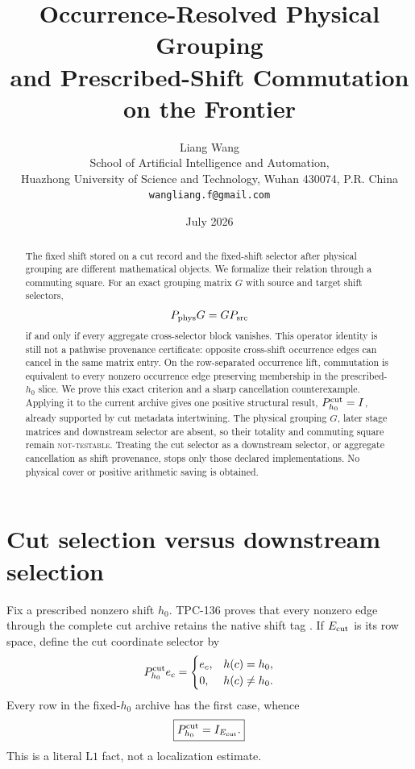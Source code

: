 \documentclass[11pt]{article}
\title{\textbf{Occurrence-Resolved Physical Grouping}\\
\textbf{and Prescribed-Shift Commutation}\\
\textbf{on the Frontier}}
\author{Liang Wang\\
School of Artificial Intelligence and Automation,\\
Huazhong University of Science and Technology, Wuhan 430074, P.R. China\\
\texttt{wangliang.f@gmail.com}}
\date{July 2026}
\theoremstyle{definition}
\theoremstyle{remark}
\newcommand{\Lone}{\mathrm{L1}}
\begin{document}
\maketitle

\begin{abstract}
The fixed shift stored on a cut record and the fixed-shift selector
after physical grouping are different mathematical objects.  We
formalize their relation through a commuting square.  For an exact
grouping matrix \(G\) with source and target shift selectors,
\[
 P_{\rm phys}G=GP_{\rm src}
\]
if and only if every aggregate cross-selector block vanishes.  This
operator identity is still not a pathwise provenance certificate:
opposite cross-shift occurrence edges can cancel in the same matrix
entry.  On the row-separated occurrence lift, commutation is
equivalent to every nonzero occurrence edge preserving membership in
the prescribed-\(h_0\) slice.  We prove this exact criterion and a
sharp cancellation counterexample.  Applying it to the current
archive gives one positive structural result,
\(P_{h_0}^{\rm cut}=I\), already supported by cut metadata
intertwining.  The physical grouping \(G\), later stage matrices and
downstream selector are absent, so their totality and commuting
square remain \textsc{not-testable}.  Treating the cut selector as a
downstream selector, or aggregate cancellation as shift provenance,
stops only those declared implementations.  No physical cover or
positive arithmetic saving is obtained.
\end{abstract}

\section{Cut selection versus downstream selection}

Fix a prescribed nonzero shift \(h_0\).  TPC-136 proves that every
nonzero edge through the complete cut archive retains the native
shift tag \citep{WangTPC136}.  If \(E_{\rm cut}\) is its row space,
define the cut coordinate selector by
\[
 P_{h_0}^{\rm cut}e_c
 =
 \begin{cases}
 e_c,&h(c)=h_0,\\
 0,&h(c)\ne h_0.
 \end{cases}
\]
Every row in the fixed-\(h_0\) archive has the first case, whence
\begin{equation}
 \boxed{P_{h_0}^{\rm cut}=I_{E_{\rm cut}}.}
 \label{eq:cutidentity}
\end{equation}
This is a literal \(\Lone\) fact, not a localization estimate.
\end{document}
